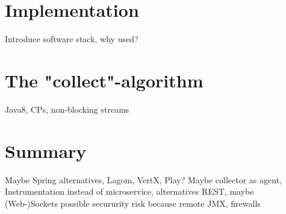 \section{Implementation}

Introduce software stack, why used?

\section{The "collect"-algorithm}

Java8, CPs, non-blocking streams


\section{Summary}

Maybe Spring alternatives, Lagom, VertX, Play?
Maybe collector as agent, Instrumentation instead of microservice, alternatives REST, maybe (Web-)Sockets
possible secururity risk because remote JMX, firewalls

